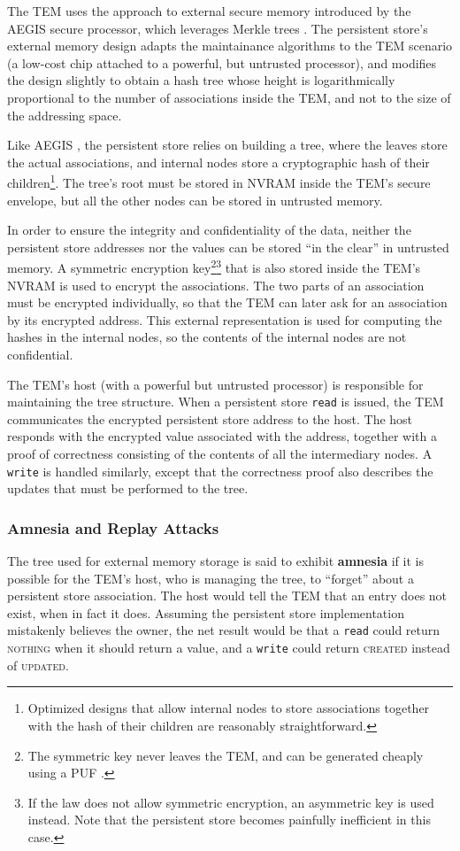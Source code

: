 The TEM uses the approach to external secure memory introduced by the AEGIS
\cite{suh2003aat} secure processor, which leverages Merkle trees
\cite{merkle1980ppk}. The persistent store's external memory design adapts the
maintainance algorithms to the TEM scenario (a low-cost chip attached to a
powerful, but untrusted processor), and modifies the design slightly to obtain a
hash tree whose height is logarithmically proportional to the number of
associations inside the TEM, and not to the size of the addressing space.

Like AEGIS \cite{suh2003aat}, the persistent store relies on building a tree,
where the leaves store the actual associations, and internal nodes store a
cryptographic hash of their children\footnote{Optimized designs that allow
internal nodes to store associations together with the hash of their children are
reasonably straightforward.}. The tree's root must be stored in NVRAM inside the
TEM's secure envelope, but all the other nodes can be stored in untrusted memory.

In order to ensure the integrity and confidentiality of the data, neither the
persistent store addresses nor the values can be stored ``in the clear'' in
untrusted memory. A symmetric encryption key\footnote{The symmetric
key never leaves the TEM, and can be generated cheaply using a PUF
\cite{gassend2002spr}. }\footnote{If the law does not allow symmetric encryption, an asymmetric key is used instead. Note that the persistent store becomes painfully inefficient in this case.} that is also stored inside the TEM's NVRAM is used to encrypt the associations. The
two parts of an association must be encrypted individually, so that the TEM can
later ask for an association by its encrypted address. This external
representation is used for computing the hashes in the internal nodes, so the
contents of the internal nodes are not confidential.

The TEM's host (with a powerful but untrusted processor) is responsible for
maintaining the tree structure. When a persistent store \texttt{read} is
issued, the TEM communicates the encrypted persistent store address to the
host. The host responds with the encrypted value associated with the
address, together with a proof of correctness consisting of the contents of all
the intermediary nodes. A \texttt{write} is handled similarly, except that the
correctness proof also describes the updates that must be performed to the
tree.

\subsubsection{Amnesia and Replay Attacks}
The tree used for external memory storage is said to exhibit
\textbf{amnesia} if it is possible for the TEM's host, who is managing the tree,
to ``forget'' about a persistent store association. The host would tell the
TEM that an entry does not exist, when in fact it does. Assuming the persistent
store implementation mistakenly believes the owner, the net result would be
that a \texttt{read} could return \textsc{nothing} when it should return a
value, and a \texttt{write} could return \textsc{created} instead of
\textsc{updated}.

